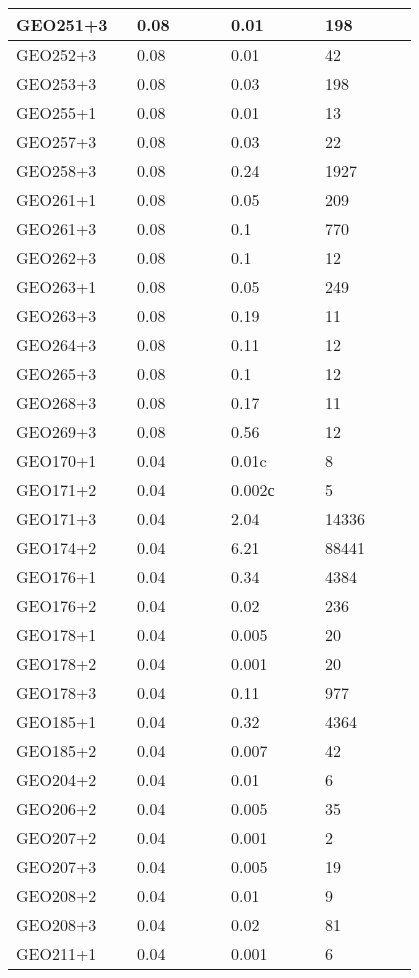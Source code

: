 \begin{longtable}[H]{|p{0.2\linewidth}|p{0.2\linewidth}|p{0.2\linewidth}|p{0.2\linewidth}|}
\hline
GEO251+3 & 0.08 & 0.01 & 198 \\
\hline
GEO252+3 & 0.08 & 0.01 & 42 \\
\hline
GEO253+3 & 0.08 & 0.03 & 198 \\
\hline
GEO255+1 & 0.08 & 0.01 & 13 \\
\hline
GEO257+3 & 0.08 & 0.03 &  22 \\
\hline
GEO258+3 & 0.08 & 0.24 &  1927 \\
\hline
GEO261+1 & 0.08 & 0.05 &  209 \\
\hline
GEO261+3 & 0.08 &  0.1 &  770 \\
\hline
GEO262+3 & 0.08 &  0.1 & 12 \\
\hline
GEO263+1 & 0.08 & 0.05 &  249 \\
\hline
GEO263+3 & 0.08 & 0.19 &  11 \\
\hline
GEO264+3 & 0.08 & 0.11 &  12 \\
\hline
GEO265+3 & 0.08 &  0.1 &  12 \\
\hline
GEO268+3 & 0.08 & 0.17 &  11 \\
\hline
GEO269+3 & 0.08 & 0.56 & 12 \\
\hline
GEO170+1 &  0.04 &  0.01c &  8 \\
\hline
GEO171+2 &  0.04 &  0.002с &  5 \\
\hline
GEO171+3 &  0.04 &  2.04 &  14336 \\
\hline
GEO174+2 &  0.04 &  6.21 &  88441 \\
\hline
GEO176+1 &  0.04 &  0.34 &  4384 \\
\hline
GEO176+2 &  0.04 &  0.02 &  236 \\
\hline
GEO178+1 &  0.04 &  0.005 &  20 \\
\hline
GEO178+2 &  0.04 &  0.001 &  20 \\
\hline
GEO178+3 &  0.04 &  0.11 &  977 \\
\hline
GEO185+1 &  0.04 &  0.32 &  4364 \\
\hline
GEO185+2 &  0.04 &  0.007 &  42 \\
\hline
GEO204+2 &  0.04 &  0.01 &  6 \\
\hline
GEO206+2 &  0.04 &  0.005 &  35 \\
\hline
GEO207+2 &  0.04 &  0.001 &  2 \\
\hline
GEO207+3 &  0.04 &  0.005 &  19 \\
\hline
GEO208+2 &  0.04 &  0.01 &  9 \\
\hline
GEO208+3 &  0.04 &  0.02 &  81 \\
\hline
GEO211+1 &  0.04 &  0.001 &  6 \\

\end{longtable}
